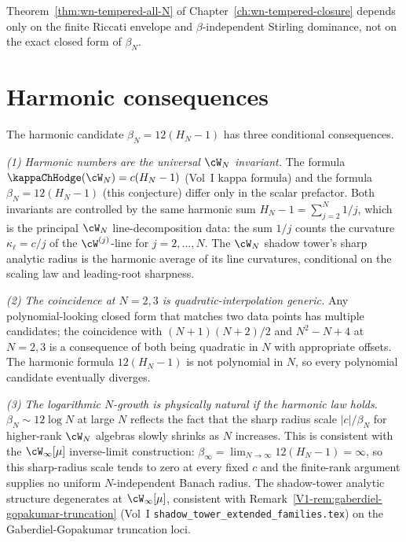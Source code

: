 Theorem~\ref{thm:wn-tempered-all-N} of Chapter~\ref{ch:wn-tempered-closure}
depends only on the finite Riccati envelope and $\beta$-independent
Stirling dominance, not on the exact closed form of $\beta_N$.

\section{Harmonic consequences}
\label{sec:beta-N-platonic-consequences}

The harmonic candidate $\beta_N = 12(H_N - 1)$ has three
conditional consequences.

\emph{(1) Harmonic numbers are the universal $\cW_N$ invariant.}
The formula $\kappaChHodge(\cW_N) = c(H_N - 1)$ (Vol~I kappa formula) and the
formula $\beta_N = 12(H_N - 1)$ (this conjecture) differ only in the
scalar prefactor. Both invariants are controlled by the same harmonic
sum $H_N - 1 = \sum_{j=2}^{N} 1/j$, which is the principal $\cW_N$
line-decomposition data: the sum $1/j$ counts the curvature $\kappa_\ell =
c/j$ of the $\cW^{(j)}$-line for $j = 2, \ldots, N$. The $\cW_N$
shadow tower's sharp analytic radius is the harmonic average of its
line curvatures, conditional on the scaling law and leading-root
sharpness.

\emph{(2) The coincidence at $N = 2, 3$ is quadratic-interpolation
generic.} Any polynomial-looking closed form that matches two data
points has multiple candidates; the coincidence with $(N+1)(N+2)/2$
and $N^2 - N + 4$ at $N = 2, 3$ is a consequence of both being
quadratic in $N$ with appropriate offsets. The harmonic formula
$12(H_N - 1)$ is not polynomial in $N$, so every polynomial candidate
eventually diverges.

\emph{(3) The logarithmic $N$-growth is physically natural if the
harmonic law holds.}
$\beta_N \sim 12 \log N$ at large $N$ reflects the fact that the sharp
radius scale $|c|/\beta_N$ for higher-rank $\cW_N$ algebras slowly
shrinks as $N$ increases. This is consistent with the
$\cW_\infty[\mu]$ inverse-limit construction:
$\beta_\infty = \lim_{N \to \infty} 12 (H_N - 1) = \infty$, so this
sharp-radius scale tends to zero at every fixed $c$ and the finite-rank
argument supplies no uniform $N$-independent Banach radius. The
shadow-tower analytic structure degenerates at $\cW_\infty[\mu]$,
consistent with
Remark~\ref{V1-rem:gaberdiel-gopakumar-truncation}
(Vol~I \texttt{shadow\_tower\_extended\_families.tex}) on the
Gaberdiel-Gopakumar truncation loci.

